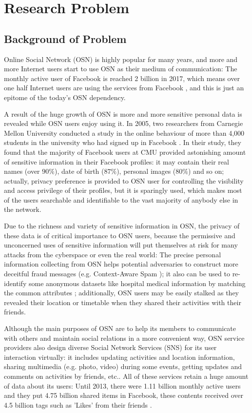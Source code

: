 \chapter{Research Problem}
\section{Background of Problem}
Online Social Network (OSN) is highly popular for many years, and more and more Internet users start to use OSN as their medium of communication: The monthly active user of Facebook is reached 2 billion in 2017, which means over one half Internet users are using the services from Facebook \cite{statista2017facebook, itstat2017population}, and this is just an epitome of the today's OSN dependency.

A result of the huge growth of OSN is more and more sensitive personal data is revealed while OSN users enjoy using it. In 2005, two researchers from Carnegie Mellon University conducted a study in the online behaviour of more than 4,000 students in the university who had signed up in Facebook \cite{gross2005information}. In their study, they found that the majority of Facebook users at CMU provided astonishing amount of sensitive information in their Facebook profiles: it may contain their real names (over $90\%$), date of birth ($87\%$), personal images ($80\%$) and so on; actually, privacy preference is provided to OSN user for controlling the visibility and access privilege of their profiles, but it is sparingly used, which makes most of the users searchable and identifiable to the vast majority of anybody else in the network. 

Due to the richness and variety of sensitive information in OSN, the privacy of these data is of critical importance to OSN users, because the permissive and unconcerned uses of sensitive information will put themselves at risk for many attacks from the cyberspace or even the real world: The precise personal information collecting from OSN helps potential adversaries to construct more deceitful fraud messages (e.g. Context-Aware Spam \cite{brown2008social}); it also can be used to re-identify some anonymous datasets like hospital medical information by matching the common attributes \cite{sweeney2002k}; additionally, OSN users may be easily stalked as they revealed their location or timetable when they shared their activities with their friends.

Although the main purposes of OSN are to help its members to communicate with others and maintain social relations in a more convenient way, OSN service providers also design diverse Social Network Services (SNS) for its user interaction virtually: it includes updating activities and location information, sharing multimedia (e.g. photo, video) during some events, getting updates and comments on activities by friends, etc.. All of these services retain a huge amount of data about its users: Until 2013, there were 1.11 billion monthly active users and they put 4.75 billion shared items in Facebook, these contents received over 4.5 billion tags such as 'Likes' from their friends \cite{facebook2013growth}. 

